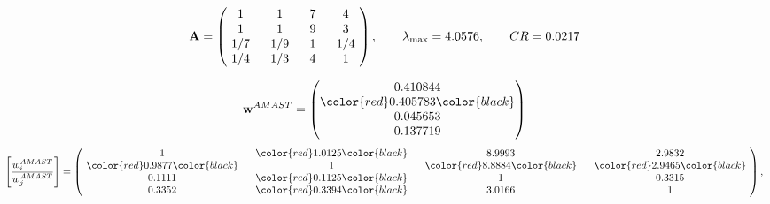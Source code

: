 \begin{example}
\begin{equation*}
\mathbf{A} =
\begin{pmatrix}
$\,\,$ 1 $\,\,$ & $\,\,$1$\,\,$ & $\,\,$7$\,\,$ & $\,\,$4 $\,\,$ \\
$\,\,$ 1 $\,\,$ & $\,\,$ 1 $\,\,$ & $\,\,$9$\,\,$ & $\,\,$3 $\,\,$ \\
$\,\,$ 1/7$\,\,$ & $\,\,$ 1/9$\,\,$ & $\,\,$ 1 $\,\,$ & $\,\,$ 1/4 $\,\,$ \\
$\,\,$ 1/4$\,\,$ & $\,\,$ 1/3$\,\,$ & $\,\,$4$\,\,$ & $\,\,$ 1  $\,\,$ \\
\end{pmatrix},
\qquad
\lambda_{\max} =
4.0576,
\qquad
CR = 0.0217
\end{equation*}

\begin{equation*}
\mathbf{w}^{AMAST} =
\begin{pmatrix}
0.410844\\
\color{red} 0.405783\color{black} \\
0.045653\\
0.137719
\end{pmatrix}\end{equation*}
\begin{equation*}
\left[ \frac{{w}^{AMAST}_i}{{w}^{AMAST}_j} \right] =
\begin{pmatrix}
$\,\,$ 1 $\,\,$ & $\,\,$\color{red} 1.0125\color{black} $\,\,$ & $\,\,$8.9993$\,\,$ & $\,\,$2.9832$\,\,$ \\
$\,\,$\color{red} 0.9877\color{black} $\,\,$ & $\,\,$ 1 $\,\,$ & $\,\,$\color{red} 8.8884\color{black} $\,\,$ & $\,\,$\color{red} 2.9465\color{black}   $\,\,$ \\
$\,\,$0.1111$\,\,$ & $\,\,$\color{red} 0.1125\color{black} $\,\,$ & $\,\,$ 1 $\,\,$ & $\,\,$0.3315 $\,\,$ \\
$\,\,$0.3352$\,\,$ & $\,\,$\color{red} 0.3394\color{black} $\,\,$ & $\,\,$3.0166$\,\,$ & $\,\,$ 1  $\,\,$ \\
\end{pmatrix},
\end{equation*}


\end{example}
